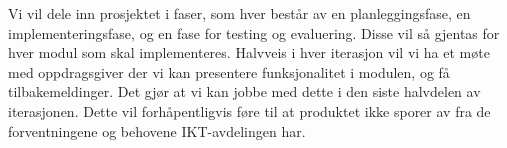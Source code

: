 Vi vil dele inn prosjektet i faser, som hver består av en planleggingsfase, en implementeringsfase, og en fase for testing og evaluering. Disse vil så gjentas for hver modul som skal implementeres. Halvveis i hver iterasjon vil vi ha et møte med oppdragsgiver der vi kan presentere funksjonalitet i modulen, og få tilbakemeldinger. Det gjør at vi kan jobbe med dette i den siste halvdelen av iterasjonen. Dette vil forhåpentligvis føre til at produktet ikke sporer av fra de forventningene og behovene IKT-avdelingen har.
